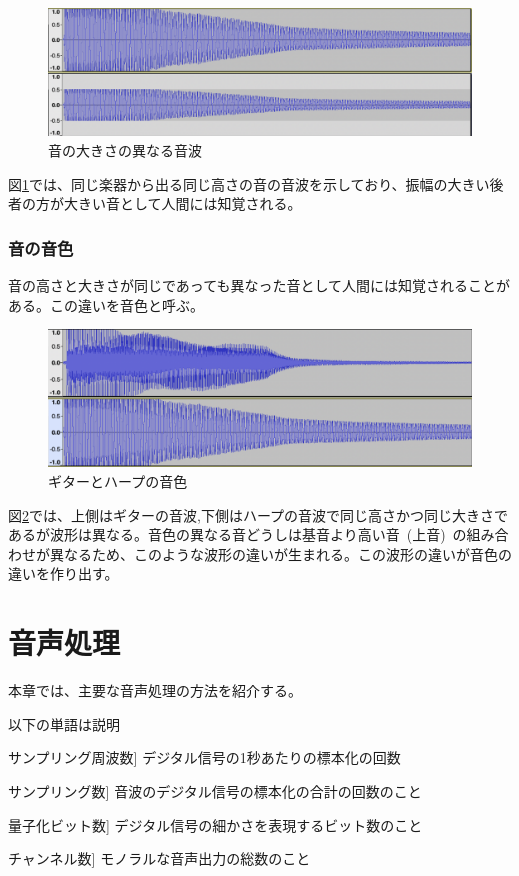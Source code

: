 \begin{figure}[t]
\begin{center}
\includegraphics[width=0.7\hsize]{figure/c4_harp_loudness.png}
\caption{音の大きさの異なる音波}
\label{fig:loudness}
\end{center}
\end{figure}

図\ref{fig:loudness}では、同じ楽器から出る同じ高さの音の音波を示しており、振幅の大きい後者の方が大きい音として人間には知覚される。

\subsection{音の音色}

音の高さと大きさが同じであっても異なった音として人間には知覚されることがある。この違いを音色と呼ぶ。

\begin{figure}[t]
\begin{center}
\includegraphics[width=0.7\hsize]{figure/c4_guitar_harp.png}
\caption{ギターとハープの音色}
\label{fig:guitar_harp_comp}
\end{center}
\end{figure}

図\ref{fig:guitar_harp_comp}では、上側はギターの音波,下側はハープの音波で同じ高さかつ同じ大きさであるが波形は異なる。音色の異なる音どうしは基音より高い音~(上音)~の組み合わせが異なるため、このような波形の違いが生まれる。この波形の違いが音色の違いを作り出す。

\chapter{音声処理}
\label{chap:preprocess}






本章では、主要な音声処理の方法を紹介する。

以下の単語は説明

サンプリング周波数] デジタル信号の1秒あたりの標本化の回数

サンプリング数] 音波のデジタル信号の標本化の合計の回数のこと

量子化ビット数] デジタル信号の細かさを表現するビット数のこと

チャンネル数] モノラルな音声出力の総数のこと